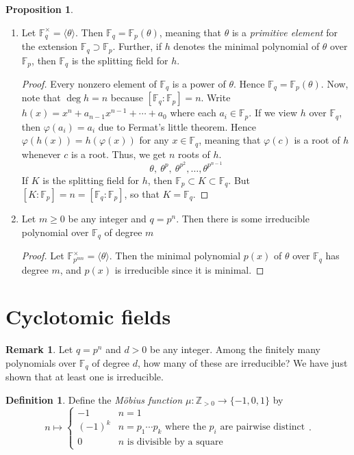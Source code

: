 \documentclass[10pt,letterpaper,cm]{nupset}
\theoremstyle{definition}
\newtheorem*{definition}{Definition}
\newtheorem{remark}{Remark}
\newtheorem{prop}{Proposition}
\newcommand{\F}{\mathbb F}
\newcommand{\Z}{\mathbb Z}
\newcommand{\1}{\mathbf{1}}
\newcommand{\0}{\vec 0}
\begin{document}
\begin{prop} $ $
\begin{enumerate}
\item Let $\F_q^{\times} = \langle \theta \rangle$. Then $\F_q =\F_p(\theta)$, meaning that $\theta$ is a \textit{primitive element} for the extension $\F_q \supset \F_p$. Further, if $h$ denotes the minimal polynomial of $\theta$ over $\F_p$, then $\F_q$ is the splitting field for $h$.
\begin{proof}
Every nonzero element of $\F_q$ is a power of $\theta$. Hence $\F_q = \F_p(\theta)$. Now, note that $\deg{h} = n$ because $[\F_q : \F_p]=n$. Write $h(x) = x^n +a_{n-1}x^{n-1}+\cdots + a_0$ where each $a_i \in \F_p$. If we view $h$ over $\F_q$, then $\varphi(a_i) = a_i$ due to Fermat's little theorem. Hence $\varphi(h(x)) = h(\varphi(x))$ for any $x\in \F_q$, meaning that $\varphi(c)$ is a root of $h$ whenever $c$ is a root. Thus, we get $n$ roots of $h$. $$ \theta, \ \theta^p, \ \theta^{p^2}, \ldots, \theta^{p^{n-1}}   $$ If $K$ is the splitting field for $h$, then $\F_p \subset K \subset \F_q$. But $[K :\F_p] = n = [\F_q: \F_p]$, so that $K = \F_q$.
\end{proof}
\item Let $m\geq 0$ be any integer and $q=p^n$. Then there is some irreducible polynomial over $\F_q$ of degree $m$
\begin{proof}
Let $\F_{p^{mn}}^{\times}=\langle \theta \rangle $. Then the minimal polynomial $p(x)$ of $\theta$ over $\F_q$ has degree $m$, and $p(x)$ is irreducible since it is minimal.
\end{proof}
\end{enumerate}
\end{prop}

\section{Cyclotomic fields}

\begin{remark}
Let $q=p^n$ and $d>0$ be any integer. Among the finitely many polynomials over $\F_q$ of degree $d$, how many of these are irreducible? We have just shown that at least one is irreducible. 
\end{remark}

\begin{definition}
Define the \textit{M\"{o}bius function $\mu : \Z_{>0} \to \{{-}1, 0, 1\}$} by $$n \mapsto \begin{cases} {-}1 & n=1\\ ({-}1)^k & n = p_1\cdots p_k \text{ where the } p_i \text{ are pairwise distinct} \\ 0 & n \text{ is divisible by a square}     \end{cases}    .$$
\end{definition}
\end{document}
